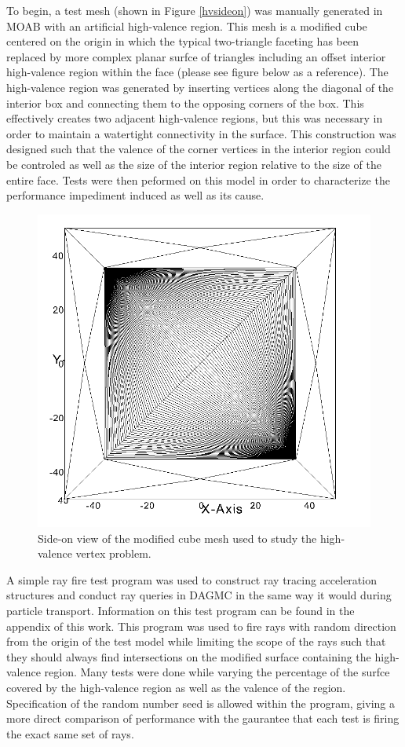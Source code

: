 \documentclass[12pt, a4paper]{article}
\begin{document}
To begin, a test mesh (shown in Figure \ref{hvsideon}) was manually generated in MOAB with an artificial high-valence region. This mesh is a modified cube centered on the origin in which the typical two-triangle faceting has been replaced by more complex planar surfce of triangles including an offset interior high-valence region within the face (please see figure below as a reference). The high-valence region was generated by inserting vertices along the diagonal of the interior box and connecting them to the opposing corners of the box. This effectively creates two adjacent high-valence regions, but this was necessary in order to maintain a watertight connectivity in the surface. This construction was designed such that the valence of the corner vertices in the interior region could be controled as well as the size of the interior region relative to the size of the entire face. Tests were then peformed on this model in order to characterize the performance impediment induced as well as its cause.

\begin{figure}[H]
  \centering
    \includegraphics[scale=0.2]{hv_study_design.png}
    \caption{Side-on view of the modified cube mesh used to study the high-valence vertex problem.}
\end{figure}

A simple ray fire test program was used to construct ray tracing acceleration structures and conduct ray queries in DAGMC in the same way it would during particle transport. Information on this test program can be found in the appendix of this work. This program was used to fire rays with random direction from the origin of the test model while limiting the scope of the rays such that they should always find intersections on the modified surface containing the high-valence region. Many tests were done while varying the percentage of the surfce covered by the high-valence region as well as the valence of the region. Specification of the random number seed is allowed within the program, giving a more direct comparison of performance with the gaurantee that each test is firing the exact same set of rays.
\end{document}
